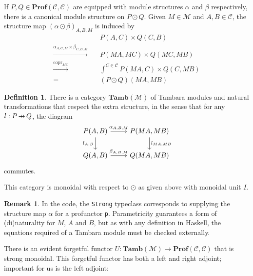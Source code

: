 \documentclass[11pt,a4paper]{article}
\theoremstyle{plain}
\theoremstyle{definition}
\newtheorem{definition}[theorem]{Definition}
\newtheorem{remark}[theorem]{Remark}
\newcommand{\C}{\mathscr{C}}
\newcommand{\M}{\mathscr{M}}
\newcommand{\Prof}{\mathbf{Prof}}
\newcommand{\Tamb}{\mathbf{Tamb}}
\DeclareMathOperator{\copr}{copr}
\newcommand{\hto}{\ensuremath{\,\mathaccent\shortmid\rightarrow\,}}
\begin{document}
If $P, Q \in \Prof(\C, \C)$ are equipped with module structures $\alpha$ and $\beta$ respectively, there is a canonical module structure on $P \odot Q$. Given $M \in \M$ and $A,B \in \C$, the structure map $(\alpha \odot \beta)_{A,B,M}$ is induced by
\begin{align*}
  &P(A,C) \times Q(C,B)  \\
  \xrightarrow{\alpha_{A,C,M} \times \beta_{C,B,M}} \quad& P(MA, MC) \times Q(MC, MB) \\
  \xrightarrow{\copr_{MC}} \quad&\int^{C \in \C} P(MA, C) \times Q(C, MB) \\
  = \quad&(P \odot Q)(MA, MB)
\end{align*}

\begin{definition}
  There is a category $\Tamb(\M)$ of Tambara modules and natural transformations that respect the extra structure, in the sense that for any $l : P \hto Q$, the diagram
  \[
    \begin{tikzcd}
      P(A,B) \ar[r, "\alpha_{A,B,M}"] \ar[d, "l_{A,B}" left] & P(MA, MB) \ar[d, "l_{MA, MB}" right] \\
      Q(A,B) \ar[r, "\beta_{A,B,M}"] & Q(MA, MB)
    \end{tikzcd}
  \]
  commutes.
\end{definition}

This category is monoidal with respect to $\odot$ as given above with monoidal unit $I$.

\begin{remark}
  In the code, the \texttt{Strong} typeclass corresponds to supplying the structure map $\alpha$ for a profunctor \texttt{p}. Parametricity guarantees a form of (di)naturality for $M$, $A$ and $B$, but as with any definition in Haskell, the equations required of a Tambara module must be checked externally.
\end{remark}

There is an evident forgetful functor $U : \Tamb(\M) \to \Prof(\C, \C)$ that is strong monoidal. This forgetful functor has both a left and right adjoint; important for us is the left adjoint:
\end{document}
